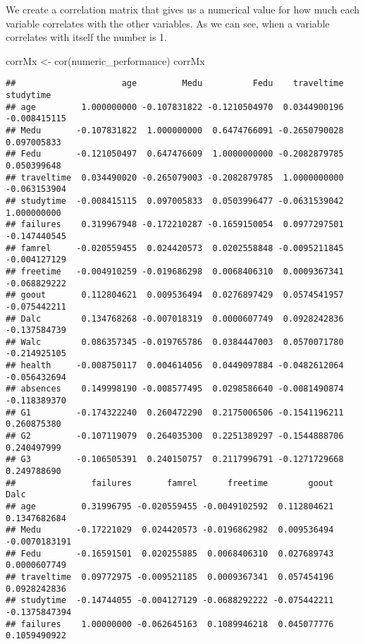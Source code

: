 \documentclass[
]{article}
\newenvironment{Shaded}{\begin{snugshade}}{\end{snugshade}}
\newcommand{\FunctionTok}[1]{\textcolor[rgb]{0.00,0.00,0.00}{#1}}
\newcommand{\NormalTok}[1]{#1}
\newcommand{\OtherTok}[1]{\textcolor[rgb]{0.56,0.35,0.01}{#1}}
\begin{document}
We create a correlation matrix that gives us a numerical value for how
much each variable correlates with the other variables. As we can see,
when a variable correlates with itself the number is 1.

\begin{Shaded}
\begin{Highlighting}[]
\NormalTok{corrMx }\OtherTok{\textless{}{-}} \FunctionTok{cor}\NormalTok{(numeric\_performance)}
\NormalTok{corrMx}
\end{Highlighting}
\end{Shaded}

\begin{verbatim}
##                     age         Medu          Fedu    traveltime    studytime
## age         1.000000000 -0.107831822 -0.1210504970  0.0344900196 -0.008415115
## Medu       -0.107831822  1.000000000  0.6474766091 -0.2650790028  0.097005833
## Fedu       -0.121050497  0.647476609  1.0000000000 -0.2082879785  0.050399648
## traveltime  0.034490020 -0.265079003 -0.2082879785  1.0000000000 -0.063153904
## studytime  -0.008415115  0.097005833  0.0503996477 -0.0631539042  1.000000000
## failures    0.319967948 -0.172210287 -0.1659150054  0.0977297501 -0.147440545
## famrel     -0.020559455  0.024420573  0.0202558848 -0.0095211845 -0.004127129
## freetime   -0.004910259 -0.019686298  0.0068406310  0.0009367341 -0.068829222
## goout       0.112804621  0.009536494  0.0276897429  0.0574541957 -0.075442211
## Dalc        0.134768268 -0.007018319  0.0000607749  0.0928242836 -0.137584739
## Walc        0.086357345 -0.019765786  0.0384447003  0.0570071780 -0.214925105
## health     -0.008750117  0.004614056  0.0449097884 -0.0482612064 -0.056432694
## absences    0.149998190 -0.008577495  0.0298586640 -0.0081490874 -0.118389370
## G1         -0.174322240  0.260472290  0.2175006506 -0.1541196211  0.260875380
## G2         -0.107119079  0.264035300  0.2251389297 -0.1544888706  0.240497999
## G3         -0.106505391  0.240150757  0.2117996791 -0.1271729668  0.249788690
##               failures       famrel      freetime        goout          Dalc
## age         0.31996795 -0.020559455 -0.0049102592  0.112804621  0.1347682684
## Medu       -0.17221029  0.024420573 -0.0196862982  0.009536494 -0.0070183191
## Fedu       -0.16591501  0.020255885  0.0068406310  0.027689743  0.0000607749
## traveltime  0.09772975 -0.009521185  0.0009367341  0.057454196  0.0928242836
## studytime  -0.14744055 -0.004127129 -0.0688292222 -0.075442211 -0.1375847394
## failures    1.00000000 -0.062645163  0.1089946218  0.045077776  0.1059490922

\end{verbatim}
\end{document}
